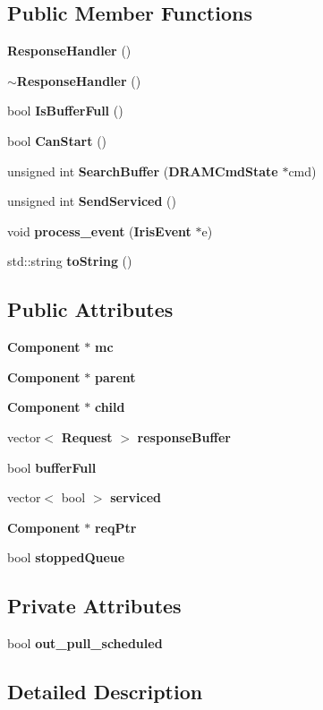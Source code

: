 \subsection*{Public Member Functions}
\begin{CompactItemize}
\item 
{\bf ResponseHandler} ()
\item 
{\bf $\sim$ResponseHandler} ()
\item 
bool {\bf IsBufferFull} ()
\item 
bool {\bf CanStart} ()
\item 
unsigned int {\bf SearchBuffer} ({\bf DRAMCmdState} $\ast$cmd)
\item 
unsigned int {\bf SendServiced} ()
\item 
void {\bf process\_\-event} ({\bf IrisEvent} $\ast$e)
\item 
std::string {\bf toString} ()
\end{CompactItemize}
\subsection*{Public Attributes}
\begin{CompactItemize}
\item 
{\bf Component} $\ast$ {\bf mc}
\item 
{\bf Component} $\ast$ {\bf parent}
\item 
{\bf Component} $\ast$ {\bf child}
\item 
vector$<$ {\bf Request} $>$ {\bf responseBuffer}
\item 
bool {\bf bufferFull}
\item 
vector$<$ bool $>$ {\bf serviced}
\item 
{\bf Component} $\ast$ {\bf reqPtr}
\item 
bool {\bf stoppedQueue}
\end{CompactItemize}
\subsection*{Private Attributes}
\begin{CompactItemize}
\item 
bool {\bf out\_\-pull\_\-scheduled}
\end{CompactItemize}


\subsection{Detailed Description}


